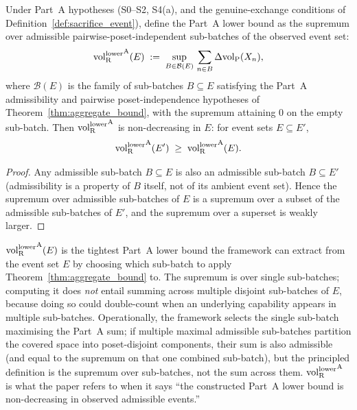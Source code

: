 \begin{proposition}
\label{prop:monotone_part_a}
Under Part~A hypotheses (S0--S2, S4(a), and the
genuine-exchange conditions of
Definition~\ref{def:sacrifice_event}), define the Part~A lower
bound as the supremum over admissible pairwise-poset-independent
sub-batches of the observed event set:
\[
  {\operatorname{vol}_{\mathrm{R}}^{\mathrm{lower}}}^{\mathrm{A}}(E) \;:=\;
  \sup_{B \in \mathcal{B}(E)}\, \sum_{n \in B}
  \Delta{\operatorname{vol}_{\mathrm{P}}}(X_n),
\]
where $\mathcal{B}(E)$ is the family of sub-batches $B
\subseteq E$ satisfying the Part~A admissibility and pairwise
poset-independence hypotheses of
Theorem~\ref{thm:aggregate_bound}, with the supremum attaining
$0$ on the empty sub-batch.  Then
${\operatorname{vol}_{\mathrm{R}}^{\mathrm{lower}}}^{\mathrm{A}}$ is non-decreasing in $E$: for event
sets $E \subseteq E'$,
\[
  {\operatorname{vol}_{\mathrm{R}}^{\mathrm{lower}}}^{\mathrm{A}}(E') \;\geq\;
  {\operatorname{vol}_{\mathrm{R}}^{\mathrm{lower}}}^{\mathrm{A}}(E).
\]
\end{proposition}

\begin{proof}
Any admissible sub-batch $B \subseteq E$ is also an admissible
sub-batch $B \subseteq E'$ (admissibility is a property of $B$
itself, not of its ambient event set).  Hence the supremum over
admissible sub-batches of $E$ is a supremum over a subset of the
admissible sub-batches of $E'$, and the supremum over a superset
is weakly larger.
\end{proof}

\begin{remark}
\label{rem:part_a_monotone_interp}
${\operatorname{vol}_{\mathrm{R}}^{\mathrm{lower}}}^{\mathrm{A}}(E)$ is the tightest Part~A lower bound
the framework can extract from the event set $E$ by choosing
which sub-batch to apply Theorem~\ref{thm:aggregate_bound} to.
The supremum is over single sub-batches; computing it does
\emph{not} entail summing across multiple disjoint sub-batches
of $E$, because doing so could double-count when an underlying
capability appears in multiple sub-batches.  Operationally, the
framework selects the single sub-batch maximising the Part~A
sum; if multiple maximal admissible sub-batches partition the
covered space into poset-disjoint components, their sum is also
admissible (and equal to the supremum on that one combined
sub-batch), but the principled definition is the supremum over
sub-batches, not the sum across them.  ${\operatorname{vol}_{\mathrm{R}}^{\mathrm{lower}}}^{\mathrm{A}}$
is what the paper refers to when it says ``the constructed
Part~A lower bound is non-decreasing in observed admissible
events.''
\end{remark}
